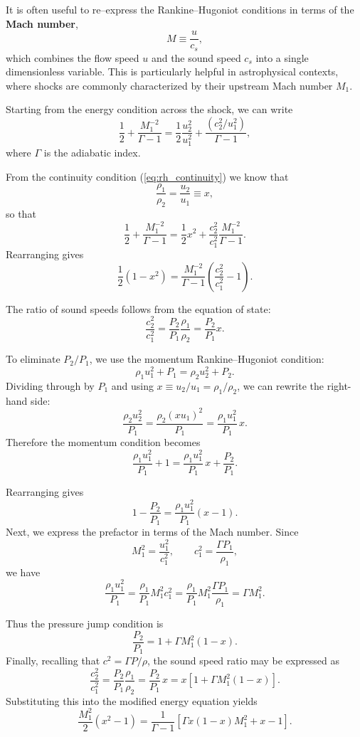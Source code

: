 It is often useful to re–express the Rankine--Hugoniot conditions in terms of the
\textbf{Mach number},
\[
M \equiv \frac{u}{c_s},
\]
which combines the flow speed $u$ and the sound speed $c_s$ into a single dimensionless variable.  
This is particularly helpful in astrophysical contexts, where shocks are commonly characterized by their upstream Mach number $M_1$.

\medskip

Starting from the energy condition across the shock, we can write
\[
\frac{1}{2} + \frac{M_1^{-2}}{\Gamma -1}
= \frac{1}{2}\frac{u_2^2}{u_1^2} + \frac{(c_2^2/u_1^2)}{\Gamma -1},
\]
where $\Gamma$ is the adiabatic index.  

\medskip

From the continuity condition (\eqref{eq:rh_continuity}) we know that
\[
\frac{\rho_1}{\rho_2} = \frac{u_2}{u_1} \equiv x ,
\]
so that
\[
\frac{1}{2} + \frac{M_1^{-2}}{\Gamma -1}
= \frac{1}{2}x^2 + \frac{c_2^2}{c_1^2}\frac{M_1^{-2}}{\Gamma -1}.
\]
Rearranging gives
\[
\frac{1}{2}(1-x^2) = \frac{M_1^{-2}}{\Gamma -1}\left(\frac{c_2^2}{c_1^2} - 1\right).
\]

\medskip

The ratio of sound speeds follows from the equation of state:
\[
\frac{c_2^2}{c_1^2} = \frac{P_2}{P_1}\frac{\rho_1}{\rho_2} = \frac{P_2}{P_1}x.
\]

To eliminate $P_2/P_1$, we use the momentum Rankine--Hugoniot condition:
\[
\rho_1 u_1^2 + P_1 = \rho_2 u_2^2 + P_2.
\]
Dividing through by $P_1$ and using $x \equiv u_2/u_1 = \rho_1/\rho_2$, we can rewrite the right-hand side:
\[
\frac{\rho_2 u_2^2}{P_1} = \frac{\rho_2 (x u_1)^2}{P_1}
= \frac{\rho_1 u_1^2}{P_1}\,x.
\]
\noindent
Therefore the momentum condition becomes
\[
\frac{\rho_1 u_1^2}{P_1} + 1 = \frac{\rho_1 u_1^2}{P_1}\,x + \frac{P_2}{P_1}.
\]

\noindent
Rearranging gives
\[
1 - \frac{P_2}{P_1} = \frac{\rho_1 u_1^2}{P_1}(x-1).
\]
Next, we express the prefactor in terms of the Mach number. Since
\[
M_1^2 = \frac{u_1^2}{c_1^2}, \qquad c_1^2 = \frac{\Gamma P_1}{\rho_1},
\]
we have
\[
\frac{\rho_1 u_1^2}{P_1} = \frac{\rho_1}{P_1} M_1^2 c_1^2
= \frac{\rho_1}{P_1} M_1^2 \frac{\Gamma P_1}{\rho_1}
= \Gamma M_1^2.
\]

\noindent
Thus the pressure jump condition is
\[
\frac{P_2}{P_1} = 1 + \Gamma M_1^2(1-x).
\]
Finally, recalling that $c^2 = \Gamma P/\rho$, the sound speed ratio may be expressed as
\[
\frac{c_2^2}{c_1^2} = \frac{P_2}{P_1}\frac{\rho_1}{\rho_2}
= \frac{P_2}{P_1}\,x
= x\left[1 + \Gamma M_1^2(1-x)\right].
\]
Substituting this into the modified energy equation yields
\[
\frac{M_1^2}{2}(x^2-1) = \frac{1}{\Gamma -1}\left[\Gamma x(1-x)M_1^{2} + x - 1\right].
\]


